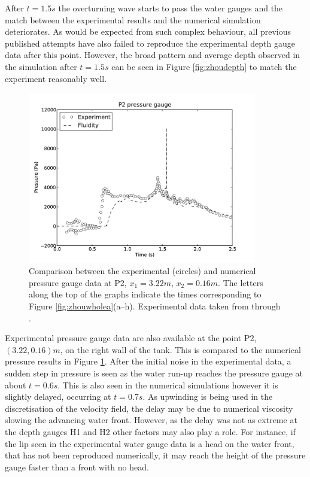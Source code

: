 After $t=1.5s$ the overturning wave starts to pass the water gauges and the match between the experimental results and the numerical simulation deteriorates. As would be expected from such complex behaviour, all previous published attempts have also failed to reproduce the experimental depth gauge data after this point.  However, the broad pattern and average depth observed in the simulation after $t=1.5s$ can be seen in Figure \ref{fig:zhoudepth} to match the experiment reasonably well.

\begin{figure}[tb]
\begin{center}
\includegraphics[width=10cm]{examples_images/water_collapse/pressure_gauge_P2.pdf}
\caption{Comparison between the experimental (circles) and numerical pressure gauge data at P2, $x_1 = 3.22m$, $x_2 = 0.16m$.  The letters along the top of the graphs indicate the times corresponding to Figure \ref{fig:zhouwholea}(a--h).  Experimental data taken from \citet{zhou_nonlinear_1999} through \citet{park_volume-of-fluid_2009}.}
\label{fig:zhoupressure}
\end{center}
\end{figure}

Experimental pressure gauge data are also available at the point P2, $(3.22,0.16)m$, on the right wall of the tank.  This is compared to the numerical pressure results in Figure \ref{fig:zhoupressure}.  After the initial noise in the experimental data, a sudden step in pressure is seen as the water run-up reaches the pressure gauge at about $t=0.6s$.  This is also seen in the numerical simulations however it is slightly delayed, occurring at $t=0.7s$.  As upwinding is being used in the discretisation of the velocity field, the delay may be due to numerical viscosity slowing the advancing water front.  However, as the delay was not as extreme at the depth gauges H1 and H2 other factors may also play a role.  For instance, if the lip seen in the experimental water gauge data is a head on the water front, that has not been reproduced numerically, it may reach the height of the pressure gauge faster than a front with no head.

